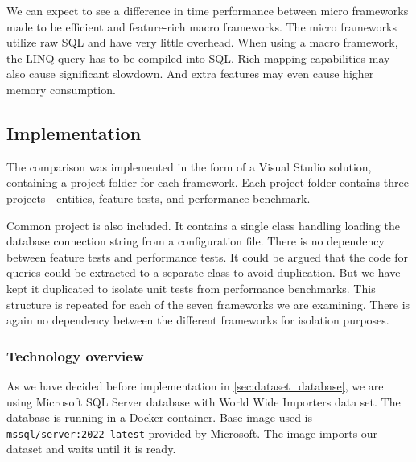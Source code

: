 We can expect to see a difference in time performance between micro frameworks made to be efficient and feature-rich macro frameworks.
The micro frameworks utilize raw SQL and have very little overhead. When using a macro framework, the LINQ query has to be compiled into SQL. Rich mapping capabilities may also cause significant slowdown. And extra features may even cause higher memory consumption.

\subsection{Implementation}
The comparison was implemented in the form of a Visual Studio solution, containing a project folder for each framework. Each project folder contains three projects - entities, feature tests, and performance benchmark. 


\usetikzlibrary{positioning, arrows}
\begin{center}
\end{center}

Common project is also included. It contains a single class handling loading the database connection string from a configuration file. There is no dependency between feature tests and performance tests. It could be argued that the code for queries could be extracted to a separate class to avoid duplication. But we have kept it duplicated to isolate unit tests from performance benchmarks. This structure is repeated for each of the seven frameworks we are examining. There is again no dependency between the different frameworks for isolation purposes.

\subsubsection{Technology overview}
As we have decided before implementation in \autoref{sec:dataset_database}, we are using Microsoft SQL Server database with World Wide Importers data set. The database is running in a Docker container. Base image used is \texttt{mssql/server:2022-latest}\cite{mssqlDocker} provided by Microsoft. The image imports our dataset and waits until it is ready.

